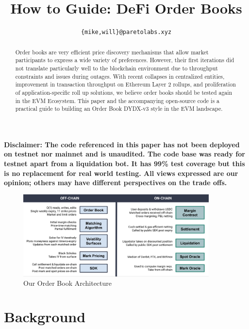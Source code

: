 \documentclass{article}
\title{How to Guide: DeFi Order Books}
\author{\texttt{\{mike,will\}@paretolabs.xyz}}
\begin{document}
\maketitle

\begin{abstract}
\noindent Order books are very efficient price discovery mechanisms that allow market participants to express a wide variety of preferences. However, their first iterations did not translate particularly well to the blockchain environment due to throughput constraints and issues during outages. With recent collapses in centralized entities, improvement in transaction throughput on Ethereum Layer 2 rollups, and proliferation of application-specific roll up solutions, we believe order books should be tested again in the EVM Ecosystem. This paper and the accompanying open-source code is a practical guide to building an Order Book DYDX-v3 style in the EVM landscape.\newline 
\end{abstract}

\newline \noindent \textbf{Disclaimer: The code referenced in this paper has not been deployed on testnet nor mainnet and is unaudited. The code base was ready for testnet apart from a liquidation bot. It has 99\% test coverage but this is no replacement for real world testing. All views expressed are our opinion; others may have different perspectives on the trade offs.}

\begin{figure}[b!]
\centering
\label{fig:overview2}
\includegraphics[width=0.9\textwidth]{images/overview2.png}
\caption{Our Order Book Architecture}
\end{figure}

\section{Background}
\end{document}
